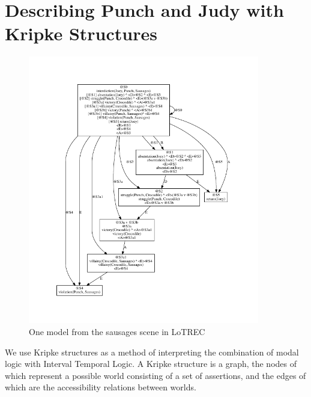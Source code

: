 \documentclass{llncs}
\begin{document}
\section{Describing Punch and Judy with Kripke Structures}\label{sec:kripke}
\begin{figure}[!t]
  \centering
    \centerline{\includegraphics[width=0.9\textwidth]{crocmodel.pdf}}
  \caption{One model from the sausages scene in LoTREC}\label{fig:lotrec}
\end{figure}

We use Kripke structures \cite{kripke1963semantical} as a method of interpreting the combination of modal logic with Interval Temporal Logic. A Kripke structure is a graph, the nodes of which represent a possible world consisting of a set of assertions, and the edges of which are the accessibility relations between worlds.
\end{document}
